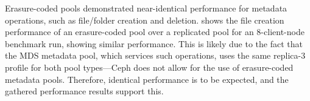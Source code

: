 Erasure-coded pools demonstrated near-identical performance for metadata operations, such as file/folder creation and deletion.  shows the file creation performance of an erasure-coded pool over a replicated pool for an 8-client-node benchmark run, showing similar performance. This is likely due to the fact that the \ac{MDS} metadata pool, which services such operations, uses the same replica-3 profile for both pool types---Ceph does not allow for the use of erasure-coded metadata pools. Therefore, identical performance is to be expected, and the gathered performance results support this.